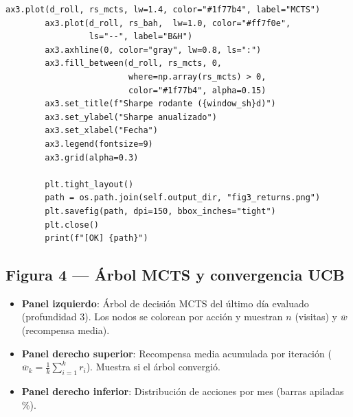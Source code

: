 \documentclass[12pt, a4paper]{article}
\begin{document}
\begin{lstlisting}[caption={Figura 3 -- retornos y rolling Sharpe}]
        ax3.plot(d_roll, rs_mcts, lw=1.4, color="#1f77b4", label="MCTS")
        ax3.plot(d_roll, rs_bah,  lw=1.0, color="#ff7f0e",
                 ls="--", label="B&H")
        ax3.axhline(0, color="gray", lw=0.8, ls=":")
        ax3.fill_between(d_roll, rs_mcts, 0,
                         where=np.array(rs_mcts) > 0,
                         color="#1f77b4", alpha=0.15)
        ax3.set_title(f"Sharpe rodante ({window_sh}d)")
        ax3.set_ylabel("Sharpe anualizado")
        ax3.set_xlabel("Fecha")
        ax3.legend(fontsize=9)
        ax3.grid(alpha=0.3)

        plt.tight_layout()
        path = os.path.join(self.output_dir, "fig3_returns.png")
        plt.savefig(path, dpi=150, bbox_inches="tight")
        plt.close()
        print(f"[OK] {path}")
\end{lstlisting}

\subsection{Figura 4 --- Árbol MCTS y convergencia UCB}

\begin{tcolorbox}[figura, title={Fig.\ 4: \texttt{fig4\_tree.png}}]
\begin{itemize}\small
  \item \textbf{Panel izquierdo}: Árbol de decisión MCTS del último día evaluado
        (profundidad 3). Los nodos se colorean por acción y muestran
        $n$ (visitas) y $\bar{w}$ (recompensa media).
  \item \textbf{Panel derecho superior}: Recompensa media acumulada por iteración
        ($\overline{w}_k = \frac{1}{k}\sum_{i=1}^k r_i$). Muestra si el árbol
        convergió.
  \item \textbf{Panel derecho inferior}: Distribución de acciones por mes
        (barras apiladas \%).
\end{itemize}
\end{tcolorbox}
\end{document}
